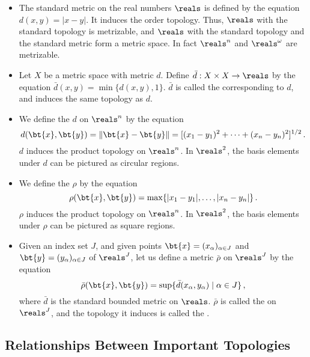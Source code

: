 \begin{itemize}
	\item The standard metric on the real numbers $\reals$ is 
	defined by the equation $d(x,y) = | x-y |$. It induces the 
	order topology. Thus, $\reals$ with the standard topology is 
	metrizable, and $\reals$ with the standard topology and the 
	standard metric form a metric space. In fact $\reals^n$ and 
	$\reals^\omega$ are 
	metrizable.
	
	\item Let $X$ be a metric space with metric $d$. Define 
	$\bar{d} : X \times X \to \reals$ by the equation $\bar{d}(x,y) 
	= \min \{ d(x,y), 1 \}$. $\bar{d}$ is called the  corresponding to $d$, and induces the same 
	topology as $d$.
	
	\item We define the  $d$ on $\reals^n$ by 
	the equation
	\[
		d(\bt{x},\bt{y}) = \| \bt{x} - \bt{y} \|
			= [(x_1 - y_1)^2 + \dots + (x_n - y_n)^2]^{1/2}\,.
	\]
	$d$ induces the product topology on $\reals^n$.
	In $\reals^2$, the basis elements under $d$ can be pictured as 
	circular regions.
	
	\item We define the  $\rho$ by the equation
	\[
		\rho(\bt{x},\bt{y}) = \max \{ |x_1-y_1|, \dots, |x_n-y_n| 
		\}\,.
	\]
	$\rho$ induces the product topology on $\reals^n$.
	In $\reals^2$, the basis elements under $\rho$ can be pictured 
	as square regions.
	
	\item Given an index set $J$, and given points $\bt{x} = 
	(x_\alpha)_{\alpha \in J}$ and $\bt{y} = (y_\alpha)_{\alpha \in 
	J}$ of $\reals^J$, let us define a metric $\bar{\rho}$ on 
	$\reals^J$ by the equation
	\[
		\bar{\rho}(\bt{x},\bt{y}) = \sup \{ \bar{d} 
		(x_\alpha,y_\alpha) \mid \alpha \in J \}\,,
	\]
	where $\bar{d}$ is the standard bounded metric on $\reals$. 
	$\bar{\rho}$ is called the  on $\reals^J$, 
	and the topology it induces is called the .
\end{itemize}


\newpage

\subsection{Relationships Between Important Topologies}

